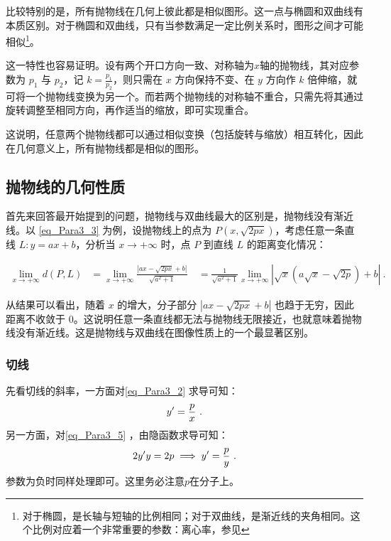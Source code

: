 比较特别的是，所有抛物线在几何上彼此都是相似图形。这一点与椭圆和双曲线有本质区别。对于椭圆和双曲线，只有当参数满足一定比例关系时，图形之间才可能相似\footnote{对于椭圆，是长轴与短轴的比例相同；对于双曲线，是渐近线的夹角相同。这个比例对应着一个非常重要的参数：离心率，参见}。

这一特性也容易证明。设有两个开口方向一致、对称轴为$x$轴的抛物线，其对应参数为 $p_1$ 与 $p_2$，记 $\displaystyle k = \frac{p_1}{p_2}$，则只需在 $x$ 方向保持不变、在 $y$ 方向作 $k$ 倍伸缩，就可将一个抛物线变换为另一个。而若两个抛物线的对称轴不重合，只需先将其通过旋转调整至相同方向，再作适当的缩放，即可实现重合。

这说明，任意两个抛物线都可以通过相似变换（包括旋转与缩放）相互转化，因此在几何意义上，所有抛物线都是相似的图形。

\subsection{抛物线的几何性质}

首先来回答最开始提到的问题，抛物线与双曲线最大的区别是，抛物线没有渐近线。以 \autoref{eq_Para3_3} 为例，设抛物线上的点为 $P(x, \sqrt{2px})$，考虑任意一条直线 $L: y = ax + b$，分析当 $x \to +\infty$ 时，点 $P$ 到直线 $L$ 的距离变化情况：

\begin{equation}
\begin{split}
\lim_{x \to +\infty} d(P, L)
&= \lim_{x \to +\infty} \frac{|ax - \sqrt{2px} + b|}{\sqrt{a^2 + 1}}\
&= \frac{1}{\sqrt{a^2 + 1}} \lim_{x \to +\infty} | \sqrt{x} \left( a\sqrt{x} - \sqrt{2p} \right) + b |~.
\end{split}
\end{equation}

从结果可以看出，随着 $x$ 的增大，分子部分 $|ax - \sqrt{2px} + b|$ 也趋于无穷，因此距离不收敛于 $0$。这说明任意一条直线都无法与抛物线无限接近，也就意味着抛物线没有渐近线。这是抛物线与双曲线在图像性质上的一个最显著区别。

\subsubsection{切线}

先看切线的斜率，一方面对\autoref{eq_Para3_2} 求导可知：
\begin{equation}\label{eq_Para3_6}
y'={p\over x}~.
\end{equation}
另一方面，对\autoref{eq_Para3_5} ，由隐函数求导可知：
\begin{equation}\label{eq_Para3_7}
2y'y=2p\implies y'={p\over y}~.
\end{equation}
参数为负时同样处理即可。这里务必注意$p$在分子上。

